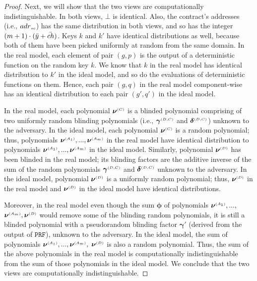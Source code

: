 \begin{proof}
 Next, we will show that the two views are computationally indistinguishable. In both views, $\bot$ is identical. Also, the contract’s addresses (i.e., ${adr}_{\scriptscriptstyle sc}$) has the same
distribution in both views, and so has the integer $(m+1)\cdot(\ddot{y}+\ddot{ch})$. Keys $k$ and $  k'$ have identical distributions as well, because both of them have been picked uniformly at random from the same domain.  In the real model, each element of pair $(g, p)$ is the output of a deterministic function on the random key $k$. We know that $k$ in the real model has identical distribution to $  k'$ in the ideal model, and so do the evaluations of deterministic functions on them. Hence, each pair $(g, q)$ in the real model component-wise has an identical distribution to each pair $(g', q')$ in the ideal model. 

In the real model, each polynomial  $\bm\nu^{\scriptscriptstyle (C)}$ is a blinded polynomial comprising of two uniformly random blinding polynomials (i.e., $\bm\gamma^{ \scriptscriptstyle {  {(D,C)}}}$ and $\bm\delta^{ \scriptscriptstyle {  {(D,C)}}}$) unknown to the adversary. In the ideal model, each polynomial  $ {\bm\nu}^{\scriptscriptstyle (C)}$ is a random polynomial; thus, polynomials $\bm\nu^{\scriptscriptstyle (A_1)},..., \bm\nu^{\scriptscriptstyle (A_m)}$ in the real model have identical distribution to  polynomials $ {\bm\nu}^{\scriptscriptstyle (A_1)}, ...,  {\bm\nu}^{\scriptscriptstyle (A_m)}$ in the ideal model.  Similarly,  polynomial $\bm\nu^{\scriptscriptstyle (D)}$ has been blinded in the real model; its blinding factors are the additive inverse of  the sum of the random polynomials $\bm\gamma^{ \scriptscriptstyle {  {(D,C)}}}$ and $\bm\delta^{ \scriptscriptstyle {  {(D,C)}}}$ unknown to the adversary. In the ideal model, polynomial $ {\bm\nu}^{\scriptscriptstyle (D)}$ is a uniformly random polynomial; thus, ${\bm\nu}^{\scriptscriptstyle (D)}$ in the real model and $ {\bm\nu}^{\scriptscriptstyle (D)}$ in the ideal model have identical distributions.

Moreover, in the real model even though the sum $\bm\phi$ of polynomials  $\bm\nu^{\scriptscriptstyle (A_1)},..., $ $\bm\nu^{\scriptscriptstyle (A_m)}, \bm\nu^{\scriptscriptstyle (D)}$ would remove some of the blinding random polynomials, it is still a blinded polynomial with a pseudorandom blinding factor $\bm\gamma'$ (derived from the output of $\mathtt{PRF}$), unknown to the adversary. In the ideal model, the sum of polynomials $ {\bm\nu}^{\scriptscriptstyle (A_1)}, ...,  {\bm\nu}^{\scriptscriptstyle (A_m)}, $ $ {\bm\nu}^{\scriptscriptstyle (D)}$ is also a random polynomial. Thus, the sum of the above polynomials in the real model is computationally indistinguishable from the sum of those polynomials in the ideal model. We conclude that the two views are computationally indistinguishable. 
\end{proof}
















